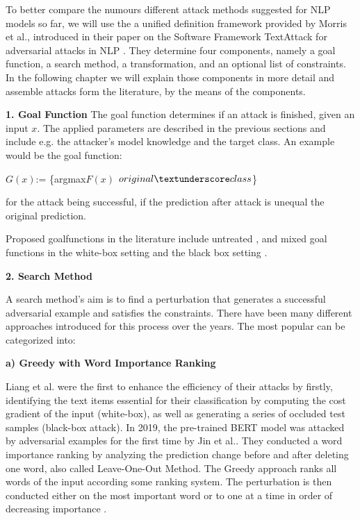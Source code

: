To better compare the numours different attack methods suggested for NLP models so far, we will use the a unified definition framework provided by Morris et al., introduced in their paper on the Software Framework TextAttack for adversarial attacks in NLP \cite{morris2020textattack}. They determine four components, namely a goal function, a search method, a transformation, and an optional list of constraints. In the following chapter we will explain those components in more detail and assemble attacks form the literature, by the means of the components.

\textbf{1. Goal Function}
The goal function determines if an attack is finished, given an input $x$. 
The applied parameters are described in the previous sections and include e.g. the attacker's model knowledge and the target class.
An example would be the goal function:

$G(x)$:= \{argmax$F(x)$ \neq $original\textunderscore class$\}

for the attack being successful, if the prediction after attack is unequal the original prediction. 

Proposed goalfunctions in the literature include untreated \cite{ebrahimi2017hotflip, alzantot2018generating, li2018textbugger, jin2019bert, garg2020bae}, and mixed goal functions \cite{gao2018black} in the white-box setting \cite{papernot2016crafting, liang2017deep, ebrahimi2017hotflip, jin2019bert} and the black box setting \cite{gao2018black, goodman2020fastwordbug}.

\textbf{2. Search Method}

A search method's aim is to find a perturbation that generates a successful adversarial example and satisfies the constraints. There have been many different approaches introduced for this process over the years. The most popular can be categorized into:

    \textbf{a) Greedy with Word Importance Ranking}
    
        Liang et al. were the first to enhance the efficiency of their attacks by firstly, identifying the text items essential for their classification by computing the cost gradient of the input (white-box), as well as generating a series of occluded test samples (black-box attack)\cite{liang2017deep}. In 2019, the pre-trained BERT model was attacked by adversarial examples for the first time by Jin et al.. They conducted a word importance ranking by analyzing the prediction change before and after deleting one word, also called Leave-One-Out Method.  The Greedy approach ranks all words of the input according some ranking system. The perturbation is then conducted either on the most important word or to one at a time in order of decreasing importance \cite{liang2017deep, gao2018black, li2018textbugger, jin2019bert, garg2020bae}. 
        

